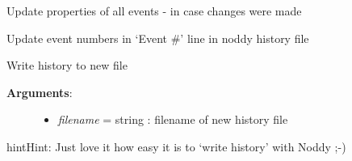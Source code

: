\documentclass[a4paper,10pt,english]{sphinxmanual}
\begin{document}
\begin{fulllineitems}
\begin{fulllineitems}
\begin{description}
\begin{itemize}
\end{itemize}

\end{description}

\end{fulllineitems}


\begin{fulllineitems}
\label{pynoddy:pynoddy.history.NoddyHistory.update_all_event_properties}
Update properties of all events - in case changes were made

\end{fulllineitems}


\begin{fulllineitems}
\label{pynoddy:pynoddy.history.NoddyHistory.update_event_numbers}
Update event numbers in `Event \#' line in noddy history file

\end{fulllineitems}


\begin{fulllineitems}
\label{pynoddy:pynoddy.history.NoddyHistory.write_history}
Write history to new file
\begin{description}
\item[{\textbf{Arguments}:}] \leavevmode\begin{itemize}
\item {} 
\emph{filename} = string : filename of new history file

\end{itemize}

\end{description}

\begin{notice}{hint}{Hint:}
Just love it how easy it is to `write history' with Noddy ;-)
\end{notice}

\end{fulllineitems}


\end{fulllineitems}
\end{document}

